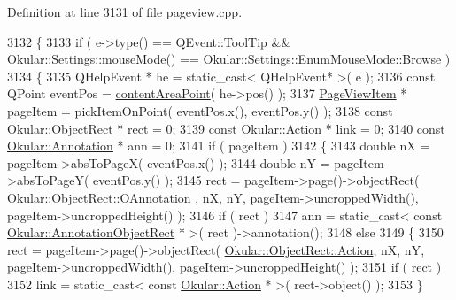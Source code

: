 Definition at line 3131 of file pageview.\+cpp.


\begin{DoxyCode}
3132 \{
3133     \textcolor{keywordflow}{if} ( e->type() == QEvent::ToolTip && \hyperlink{classOkular_1_1Settings_af8e39e25e841b413d67af2cb4dfc0688}{Okular::Settings::mouseMode}() == 
      \hyperlink{classOkular_1_1Settings_1_1EnumMouseMode_ab2ae04e2d7d069f02195ccf32c52415bae5c77f74b0cf35d7838da1baaad4e822}{Okular::Settings::EnumMouseMode::Browse} )
3134     \{
3135         QHelpEvent * he = \textcolor{keyword}{static\_cast<} QHelpEvent* \textcolor{keyword}{>}( e );
3136         \textcolor{keyword}{const} QPoint eventPos = \hyperlink{classPageView_a7f432d3d6d05c69b568ad66a9c232cd7}{contentAreaPoint}( he->pos() );
3137         \hyperlink{classPageViewItem}{PageViewItem} * pageItem = pickItemOnPoint( eventPos.x(), eventPos.y() );
3138         \textcolor{keyword}{const} \hyperlink{classOkular_1_1ObjectRect}{Okular::ObjectRect} * rect = 0;
3139         \textcolor{keyword}{const} \hyperlink{classOkular_1_1Action}{Okular::Action} * link = 0;
3140         \textcolor{keyword}{const} \hyperlink{classOkular_1_1Annotation}{Okular::Annotation} * ann = 0;
3141         \textcolor{keywordflow}{if} ( pageItem )
3142         \{
3143             \textcolor{keywordtype}{double} nX = pageItem->absToPageX( eventPos.x() );
3144             \textcolor{keywordtype}{double} nY = pageItem->absToPageY( eventPos.y() );
3145             rect = pageItem->page()->objectRect( \hyperlink{classOkular_1_1ObjectRect_a2f77f7653306bae90bfb68277aaafe16a7fa3680e4804e223e58ce2dea398345f}{Okular::ObjectRect::OAnnotation}
      , nX, nY, pageItem->uncroppedWidth(), pageItem->uncroppedHeight() );
3146             \textcolor{keywordflow}{if} ( rect )
3147                 ann = \textcolor{keyword}{static\_cast<} \textcolor{keyword}{const }\hyperlink{classOkular_1_1AnnotationObjectRect}{Okular::AnnotationObjectRect} * \textcolor{keyword}{>}( rect
       )->annotation();
3148             \textcolor{keywordflow}{else}
3149             \{
3150                 rect = pageItem->page()->objectRect( \hyperlink{classOkular_1_1ObjectRect_a2f77f7653306bae90bfb68277aaafe16a2ad02138861dfdc8bc2a0c29bae5bed2}{Okular::ObjectRect::Action}, 
      nX, nY, pageItem->uncroppedWidth(), pageItem->uncroppedHeight() );
3151                 \textcolor{keywordflow}{if} ( rect )
3152                     link = \textcolor{keyword}{static\_cast<} \textcolor{keyword}{const }\hyperlink{classOkular_1_1Action}{Okular::Action} * \textcolor{keyword}{>}( rect->object() );
3153             \}

\end{DoxyCode}
